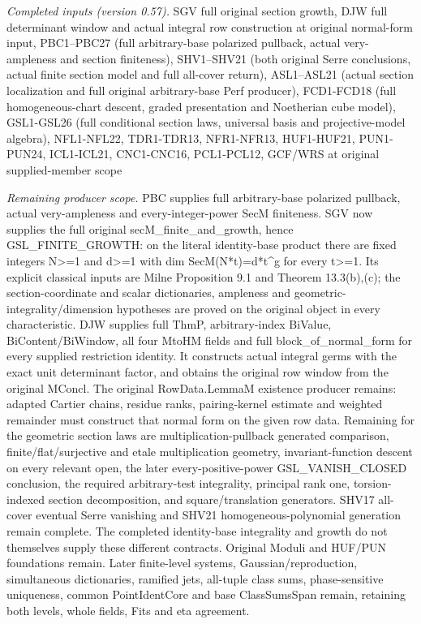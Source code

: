 \documentclass[11pt,a4paper]{article}
\numberwithin{equation}{section}
\theoremstyle{remark}\newtheorem{remark}[theorem]{Remark}
\begin{document}
\emph{Completed inputs (version 0.57).} SGV full original section growth, DJW full determinant window and actual integral row construction at original normal-form input, PBC1–PBC27 (full arbitrary-base polarized pullback, actual very-ampleness and section finiteness), SHV1–SHV21 (both original Serre conclusions, actual finite section model and full all-cover return), ASL1–ASL21 (actual section localization and full original arbitrary-base Perf producer), FCD1-FCD18 (full homogeneous-chart descent, graded presentation and Noetherian cube model), GSL1-GSL26 (full conditional section laws, universal basis and projective-model algebra), NFL1-NFL22, TDR1-TDR13, NFR1-NFR13, HUF1-HUF21, PUN1-PUN24, ICL1-ICL21, CNC1-CNC16, PCL1-PCL12, GCF/WRS at original supplied-member scope

\emph{Remaining producer scope.} PBC supplies full arbitrary-base polarized pullback, actual very-ampleness and every-integer-power SecM finiteness. SGV now supplies the full original secM\_\allowbreak finite\_\allowbreak and\_\allowbreak growth, hence GSL\_\allowbreak FINITE\_\allowbreak GROWTH: on the literal identity-base product there are fixed integers N>=1 and d>=1 with dim SecM(N*t)=d*t\textasciicircum{}g for every t>=1. Its explicit classical inputs are Milne Proposition 9.1 and Theorem 13.3(b),(c); the section-coordinate and scalar dictionaries, ampleness and geometric-integrality/dimension hypotheses are proved on the original object in every characteristic. DJW supplies full ThmP, arbitrary-index BiValue, BiContent/BiWindow, all four MtoHM fields and full block\_\allowbreak of\_\allowbreak normal\_\allowbreak form for every supplied restriction identity. It constructs actual integral germs with the exact unit determinant factor, and obtains the original row window from the original MConcl. The original RowData.LemmaM existence producer remains: adapted Cartier chains, residue ranks, pairing-kernel estimate and weighted remainder must construct that normal form on the given row data. Remaining for the geometric section laws are multiplication-pullback generated comparison, finite/flat/surjective and etale multiplication geometry, invariant-function descent on every relevant open, the later every-positive-power GSL\_\allowbreak VANISH\_\allowbreak CLOSED conclusion, the required arbitrary-test integrality, principal rank one, torsion-indexed section decomposition, and square/translation generators. SHV17 all-cover eventual Serre vanishing and SHV21 homogeneous-polynomial generation remain complete. The completed identity-base integrality and growth do not themselves supply these different contracts. Original Moduli and HUF/PUN foundations remain. Later finite-level systems, Gaussian/reproduction, simultaneous dictionaries, ramified jets, all-tuple class sums, phase-sensitive uniqueness, common PointIdentCore and base ClassSumsSpan remain, retaining both levels, whole fields, Fits and eta agreement.
\end{document}
